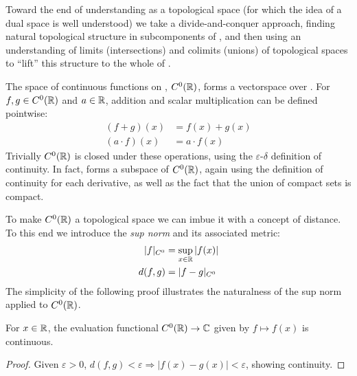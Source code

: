 
    Toward the end of understanding \D as a topological space (for which the idea of a dual space is well understood) we take a divide-and-conquer approach, finding natural topological structure in subcomponents of \D, and then using an understanding of limits (intersections) and colimits (unions) of topological spaces to ``lift'' this structure to the whole of \D.

    The space of continuous functions on \R, $C^0(\mathbb{R})$, forms a vectorspace over \R.
    For $f,g\in C^0(\mathbb{R})$ and $a\in\mathbb{R}$, addition and scalar multiplication can be defined pointwise: 
    \begin{align*}
      (f+g)(x) &= f(x)+g(x)\\
      (a\cdot f)(x) &= a\cdot f(x)
    \end{align*}
    Trivially $C^0(\mathbb{R})$ is closed under these operations, using the $\varepsilon$-$\delta$ definition of continuity.
    In fact, \D forms a subspace of $C^0(\mathbb{R})$, again using the definition of continuity for each derivative, as well as the fact that the union of compact sets is compact.

    To make $C^0(\mathbb{R})$ a topological space we can imbue it with a concept of distance.
    To this end we introduce the \emph{sup norm} and its associated metric:
    \begin{align*}
      |f|_{C^0} &= \sup_{x\in\mathbb{R}}|f(x)|\\
      d(f,g) &= |f-g|_{C^0}
    \end{align*}
    The simplicity of the following proof illustrates the naturalness of the sup norm applied to $C^0(\mathbb{R})$.

    \begin{claim}
      For $x\in\mathbb{R}$, the evaluation functional $C^0(\mathbb{R})\rightarrow\mathbb{C}$ given by $f\mapsto f(x)$ is continuous.
      \begin{proof}
        Given $\varepsilon > 0$, $d(f,g)<\varepsilon \Rightarrow |f(x)-g(x)|<\varepsilon$, showing continuity.
      \end{proof}
    \end{claim}

